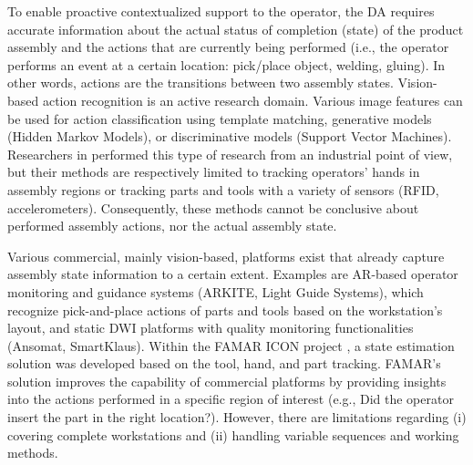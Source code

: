 To enable proactive contextualized support to the operator, the DA requires accurate information about the actual status of completion (state) of the product assembly and the actions that are currently being performed (i.e., the operator performs an event at a certain location: pick/place object, welding, gluing). In other words, actions are the transitions between two assembly states. Vision-based action recognition \cite{beddiar2020VisionbasedHumanActivity, zhang2017ReviewHumanActivity} is an active research domain. Various image features can be used for action classification using template matching, generative models (Hidden Markov Models), or discriminative models (Support Vector Machines). Researchers in \cite{kaczmarek2015ProgressMonitoringGesture,karcher2018SensordrivenAnalysisManual} performed this type of research from an industrial point of view, but their methods are respectively limited to tracking operators' hands in assembly regions or tracking parts and tools with a variety of sensors (RFID, accelerometers). Consequently, these methods cannot be conclusive about performed assembly actions, nor the actual assembly state.

Various commercial, mainly vision-based, platforms exist that already capture assembly state information to a certain extent. Examples are AR-based operator monitoring and guidance systems (ARKITE, Light Guide Systems), which recognize pick-and-place actions of parts and tools based on the workstation's layout, and static DWI platforms with quality monitoring functionalities (Ansomat, SmartKlaus). Within the FAMAR ICON project \cite{zogopoulos2021ImagebasedStateTracking}, a state estimation solution was developed based on the tool, hand, and part tracking. FAMAR's solution improves the capability of commercial platforms by providing insights into the actions performed in a specific region of interest (e.g., Did the operator insert the part in the right location?). However, there are limitations regarding (i) covering complete workstations and (ii) handling variable sequences and working methods. 